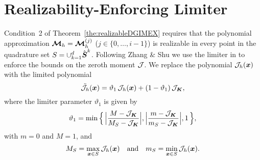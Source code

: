 \section{Realizability-Enforcing Limiter}
\label{sec:limiter}

Condition~2 of Theorem~\ref{the:realizableDGIMEX} requires that the polynomial approximation $\boldsymbol{\mathcal{M}}_{h}=\boldsymbol{\mathcal{M}}_{h}^{(j)}$ ($j\in\{0,\ldots,i-1\}$) is realizable in every point in the quadrature set $S=\cup_{k=1}^{d}\hat{\boldsymbol{S}}^{k}$.  
Following Zhang \& Shu \cite{zhangShu_2010a} we use the limiter in \cite{liuOsher_1996} to enforce the bounds on the zeroth moment $\mathcal{J}$.  
We replace the polynomial $\mathcal{J}_{h}(\boldsymbol{x})$ with the limited polynomial
\begin{equation}
  \tilde{\mathcal{J}}_{h}(\boldsymbol{x})
  =\vartheta_{1}\,\mathcal{J}_{h}(\boldsymbol{x})+(1-\vartheta_{1})\,\mathcal{J}_{\boldsymbol{K}},
  \label{eq:limitDensity}
\end{equation}
where the limiter parameter $\vartheta_{1}$ is given by
\begin{equation}
  \vartheta_{1}
  =\min\Big\{\,\Big|\frac{M-\mathcal{J}_{\boldsymbol{K}}}{M_{S}-\mathcal{J}_{\boldsymbol{K}}}\Big|,\Big|\frac{m-\mathcal{J}_{\boldsymbol{K}}}{m_{S}-\mathcal{J}_{\boldsymbol{K}}}\Big|,1\,\Big\},
\end{equation}
with $m=0$ and $M=1$, and
\begin{equation}
  M_{S}=\max_{\boldsymbol{x}\in S}\mathcal{J}_{h}(\boldsymbol{x})
  \quad\text{and}\quad
  m_{S}=\min_{\boldsymbol{x}\in S}\mathcal{J}_{h}(\boldsymbol{x}).  
\end{equation}

